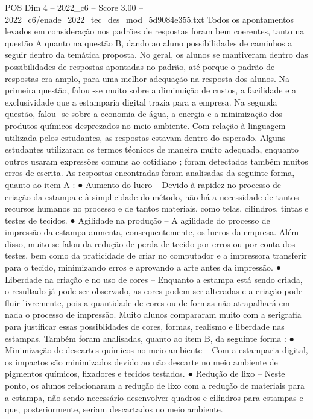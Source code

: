 \begin{textsample}{POS Dim 4 – 2022\_c6 – Score 3.00 – 2022\_c6/enade\_2022\_tec\_des\_mod\_5d9084e355.txt}
Todos os apontamentos levados em consideração nos padrões de respostas foram bem coerentes, tanto na questão A quanto na questão B, dando ao aluno possibilidades de caminhos a seguir dentro da temática proposta.
No geral, os alunos se mantiveram dentro das possibilidades de respostas apontadas no padrão, até porque o padrão de respostas era amplo, para uma melhor adequação na resposta dos alunos.
Na primeira questão, falou -se muito sobre a diminuição de custos, a facilidade e a exclusividade que a estamparia digital trazia para a empresa.
Na segunda questão, falou -se sobre a economia de água, a energia e a minimização dos produtos químicos desprezados no meio ambiente.
Com relação à linguagem utilizada pelos estudantes, as respostas estavam dentro do esperado.
Alguns estudantes utilizaram os termos técnicos de maneira muito adequada, enquanto outros usaram expressões comuns ao cotidiano ; foram detectados também muitos erros de escrita.
As respostas encontradas foram analisadas da seguinte forma, quanto ao item A : {\EmojiFont ●} Aumento do lucro – Devido à rapidez no processo de criação da estampa e à simplicidade do método, não há a necessidade de tantos recursos humanos no processo e de tantos materiais, como telas, cilindros, tintas e testes de tecidos. {\EmojiFont ●} Agilidade na produção – A agilidade do processo de impressão da estampa aumenta, consequentemente, os lucros da empresa.
Além disso, muito se falou da redução de perda de tecido por erros ou por conta dos testes, bem como da praticidade de criar no computador e a impressora transferir para o tecido, minimizando erros e aprovando a arte antes da impressão. {\EmojiFont ●} Liberdade na criação e no uso de cores – Enquanto a estampa está sendo criada, o resultado já pode ser observado, as cores podem ser alteradas e a criação pode fluir livremente, pois a quantidade de cores ou de formas não atrapalhará em nada o processo de impressão.
Muito alunos compararam muito com a serigrafia para justificar essas possiblidades de cores, formas, realismo e liberdade nas estampas.
Também foram analisadas, quanto ao item B, da seguinte forma : {\EmojiFont ●} Minimização de descartes químicos no meio ambiente – Com a estamparia digital, os impactos são minimizados devido ao não descarte no meio ambiente de pigmentos químicos, fixadores e tecidos testados. {\EmojiFont ●} Redução de lixo – Neste ponto, os alunos relacionaram a redução de lixo com a redução de materiais para a estampa, não sendo necessário desenvolver quadros e cilindros para estampas e que, posteriormente, seriam descartados no meio ambiente.

\end{textsample}
